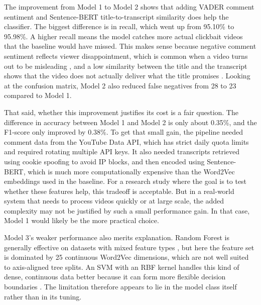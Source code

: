 \documentclass[conference]{IEEEtran}
\begin{document}
The improvement from Model 1 to Model 2 shows that adding VADER comment sentiment and Sentence-BERT title-to-transcript similarity does help the classifier. The biggest difference is in recall, which went up from 95.10\% to 95.98\%. A higher recall means the model catches more actual clickbait videos that the baseline would have missed. This makes sense because negative comment sentiment reflects viewer disappointment, which is common when a video turns out to be misleading \cite{elyashar2022}, and a low similarity between the title and the transcript shows that the video does not actually deliver what the title promises \cite{varshney2021, ahmadi2023}. Looking at the confusion matrix, Model 2 also reduced false negatives from 28 to 23 compared to Model 1.

That said, whether this improvement justifies its cost is a fair question. The difference in accuracy between Model 1 and Model 2 is only about 0.35\%, and the F1-score only improved by 0.38\%. To get that small gain, the pipeline needed comment data from the YouTube Data API, which has strict daily quota limits and required rotating multiple API keys. It also needed transcripts retrieved using cookie spoofing to avoid IP blocks, and then encoded using Sentence-BERT, which is much more computationally expensive than the Word2Vec embeddings used in the baseline. For a research study where the goal is to test whether these features help, this tradeoff is acceptable. But in a real-world system that needs to process videos quickly or at large scale, the added complexity may not be justified by such a small performance gain. In that case, Model 1 would likely be the more practical choice.

Model 3's weaker performance also merits explanation. Random Forest is generally effective on datasets with mixed feature types \cite{gothankar2022}, but here the feature set is dominated by 25 continuous Word2Vec dimensions, which are not well suited to axis-aligned tree splits. An SVM with an RBF kernel handles this kind of dense, continuous data better because it can form more flexible decision boundaries \cite{vierti2019}. The limitation therefore appears to lie in the model class itself rather than in its tuning.
\end{document}
